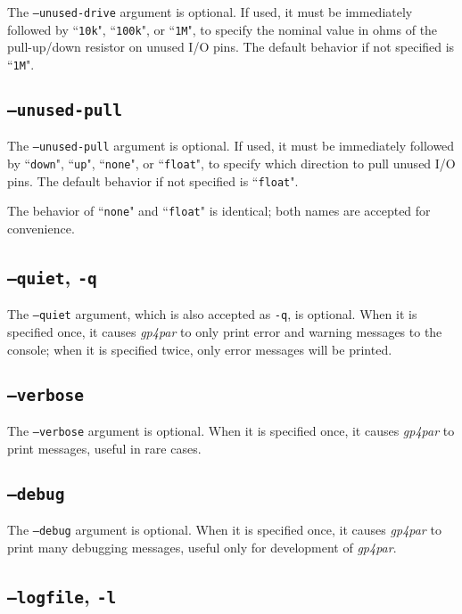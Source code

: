 \documentclass[11pt]{article}
\newcommand{\namestyle}[1]{\textit{#1}}
\newcommand{\tokenstyle}[1]{\texttt{#1}}
\begin{document}
The \texttt{--unused-drive} argument is optional. If used, it must be immediately followed by ``\tokenstyle{10k}", 
``\tokenstyle{100k}", or ``\tokenstyle{1M}", to specify the nominal value in ohms of the pull-up/down resistor on
unused I/O pins. The default behavior if not specified is ``\tokenstyle{1M}".

\subsection{\texttt{--unused-pull}}

The \texttt{--unused-pull} argument is optional. If used, it must be immediately followed by ``\tokenstyle{down}", 
``\tokenstyle{up}", ``\tokenstyle{none}", or ``\tokenstyle{float}", to specify which direction to pull unused I/O pins.
The default behavior if not specified is ``\tokenstyle{float}".

The behavior of ``\tokenstyle{none}" and ``\tokenstyle{float}" is identical; both names are accepted for convenience.

\subsection{\texttt{--quiet}, \texttt{-q}}

The \texttt{--quiet} argument, which is also accepted as \texttt{-q}, is optional. When it is specified once, it
causes \namestyle{gp4par} to only print error and warning messages to the console; when it is specified twice,
only error messages will be printed.

\subsection{\texttt{--verbose}}

The \texttt{--verbose} argument is optional. When it is specified once, it causes \namestyle{gp4par} to print
messages, useful in rare cases.

\subsection{\texttt{--debug}}

The \texttt{--debug} argument is optional. When it is specified once, it causes \namestyle{gp4par} to print
many debugging messages, useful only for development of \namestyle{gp4par}.

\subsection{\texttt{--logfile}, \texttt{-l}}
\end{document}
